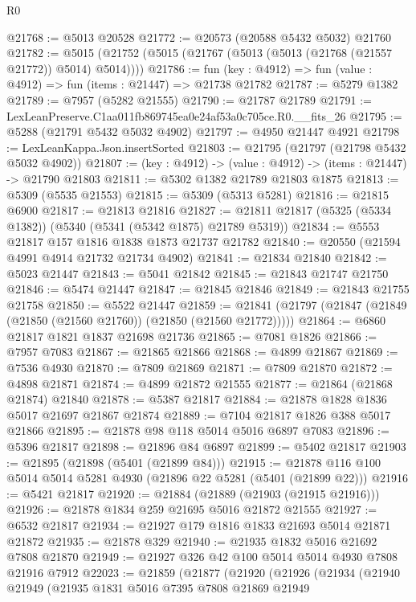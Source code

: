 \begin{lexlean}{R0}
\begin{coremodule}
@21768 := @5013 @20528
@21772 := @20573 (@20588 @5432 @5032) @21760
@21782 := @5015 (@21752 (@5015 (@21767 (@5013 (@5013 (@21768 (@21557 @21772)) @5014) @5014))))
@21786 := fun (key : @4912) => fun (value : @4912) => fun (items : @21447) => @21738 @21782
@21787 := @5279 @1382
@21789 := @7957 (@5282 @21555)
@21790 := @21787 @21789
@21791 := LexLeanPreserve.C1aa011fb869745ea0e24af53a0c705ce.R0.__fits_26
@21795 := @5288 (@21791 @5432 @5032 @4902)
@21797 := @4950 @21447 @4921
@21798 := LexLeanKappa.Json.insertSorted
@21803 := @21795 (@21797 (@21798 @5432 @5032 @4902))
@21807 := (key : @4912) -> (value : @4912) -> (items : @21447) -> @21790 @21803
@21811 := @5302 @1382 @21789 @21803 @1875
@21813 := @5309 (@5535 @21553)
@21815 := @5309 (@5313 @5281)
@21816 := @21815 @6900
@21817 := @21813 @21816
@21827 := @21811 @21817 (@5325 (@5334 @1382)) (@5340 (@5341 (@5342 @1875) @21789 @5319))
@21834 := @5553 @21817 @157 @1816 @1838 @1873 @21737 @21782
@21840 := @20550 (@21594 @4991 @4914 @21732 @21734 @4902)
@21841 := @21834 @21840
@21842 := @5023 @21447
@21843 := @5041 @21842
@21845 := @21843 @21747 @21750
@21846 := @5474 @21447
@21847 := @21845 @21846
@21849 := @21843 @21755 @21758
@21850 := @5522 @21447
@21859 := @21841 (@21797 (@21847 (@21849 (@21850 (@21560 @21760)) (@21850 (@21560 @21772)))))
@21864 := @6860 @21817 @1821 @1837 @21698 @21736
@21865 := @7081 @1826
@21866 := @7957 @7083
@21867 := @21865 @21866
@21868 := @4899 @21867
@21869 := @7536 @4930
@21870 := @7809 @21869
@21871 := @7809 @21870
@21872 := @4898 @21871
@21874 := @4899 @21872 @21555
@21877 := @21864 (@21868 @21874) @21840
@21878 := @5387 @21817
@21884 := @21878 @1828 @1836 @5017 @21697 @21867 @21874
@21889 := @7104 @21817 @1826 @388 @5017 @21866
@21895 := @21878 @98 @118 @5014 @5016 @6897 @7083
@21896 := @5396 @21817
@21898 := @21896 @84 @6897
@21899 := @5402 @21817
@21903 := @21895 (@21898 (@5401 (@21899 @84)))
@21915 := @21878 @116 @100 @5014 @5014 @5281 @4930 (@21896 @22 @5281 (@5401 (@21899 @22)))
@21916 := @5421 @21817
@21920 := @21884 (@21889 (@21903 (@21915 @21916)))
@21926 := @21878 @1834 @259 @21695 @5016 @21872 @21555
@21927 := @6532 @21817
@21934 := @21927 @179 @1816 @1833 @21693 @5014 @21871 @21872
@21935 := @21878 @329
@21940 := @21935 @1832 @5016 @21692 @7808 @21870
@21949 := @21927 @326 @42 @100 @5014 @5014 @4930 @7808 @21916 @7912
@22023 := @21859
    (@21877
      (@21920
        (@21926
          (@21934
            (@21940
              @21949
              (@21935
                @1831
                @5016
                @7395
                @7808
                @21869
                @21949

\end{coremodule}
\end{lexlean}
